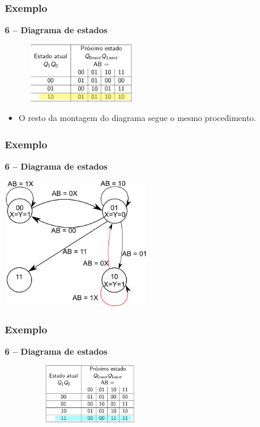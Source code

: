 \documentclass{beamer}
\begin{document}
\begin{frame}
  \frametitle{Exemplo}
  \textbf{6 – Diagrama de estados}
  \begin{center}
   \includegraphics[height = 1in, width = 2.7in]{Diagrama_estado_tabela_3.png}
  \end{center}

  \begin{itemize}
   \item O resto da montagem do diagrama segue o mesmo procedimento. 
  \end{itemize} 
\end{frame}

\begin{frame}
  \frametitle{Exemplo}
  \textbf{6 – Diagrama de estados}
  \begin{center}
   \includegraphics[height = 2.2in, width = 2.5in]{Diagrama_de_estado_ex5.png}
  \end{center}
\end{frame}

\begin{frame}
  \frametitle{Exemplo}
  \textbf{6 – Diagrama de estados}
  \begin{center}
   \includegraphics[height = 1in, width = 3in]{Diagrama_estado_tabela_4.png}
  \end{center}
\end{frame}
\end{document}
